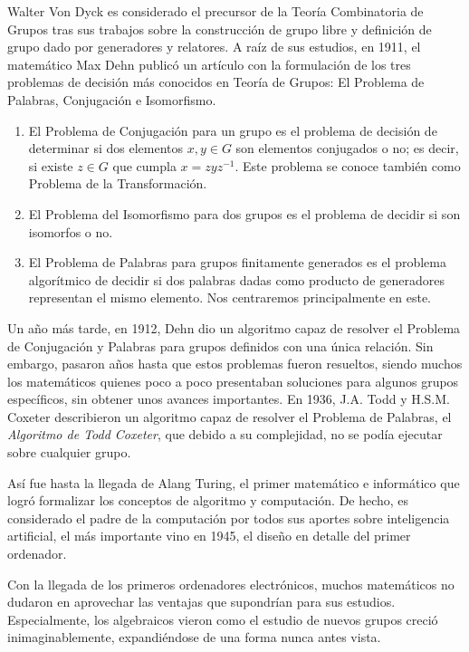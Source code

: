  Walter Von Dyck es considerado el precursor de la Teoría Combinatoria de Grupos tras sus trabajos sobre la construcción de grupo libre y definición de grupo dado por generadores y relatores. A raíz de sus estudios, en 1911, el matemático Max Dehn publicó un artículo con la formulación de los tres problemas de decisión más conocidos en Teoría de Grupos: El Problema de Palabras, Conjugación e Isomorfismo.

\begin{enumerate}
    \item El Problema de Conjugación para un grupo es el problema de decisión de determinar si dos elementos $x, y \in G$ son elementos conjugados o no; es decir, si existe $z\in G$ que cumpla $x=zyz^{-1}$. Este problema se conoce también como Problema de la Transformación.
    
    \item El Problema del Isomorfismo para dos grupos es el problema de decidir si son isomorfos o no.
    
    \item El Problema de Palabras para grupos finitamente generados es el problema algorítmico de decidir si dos palabras dadas como producto de generadores representan el mismo elemento. Nos centraremos principalmente en este.
\end{enumerate}

Un año más tarde, en 1912, Dehn dio un algoritmo capaz de resolver el Problema de Conjugación y Palabras para grupos definidos con una única relación. Sin embargo, pasaron años hasta que estos problemas fueron resueltos, siendo muchos los matemáticos quienes poco a poco presentaban soluciones para algunos grupos específicos, sin obtener unos avances importantes. En 1936, J.A. Todd y H.S.M. Coxeter describieron un algoritmo capaz de resolver el Problema de Palabras, el \textit{Algoritmo de Todd Coxeter}, que debido a su complejidad, no se podía ejecutar sobre cualquier grupo.

Así fue hasta la llegada de Alang Turing, el primer matemático e informático que logró formalizar los conceptos de algoritmo y computación. De hecho, es considerado el padre de la computación por todos sus aportes sobre inteligencia artificial, el más importante vino en 1945, el diseño en detalle del primer ordenador.

Con la llegada de los primeros ordenadores electrónicos, muchos matemáticos no dudaron en aprovechar las ventajas que supondrían para sus estudios. Especialmente, los algebraicos vieron como el estudio de nuevos grupos creció inimaginablemente, expandiéndose de una forma nunca antes vista.

